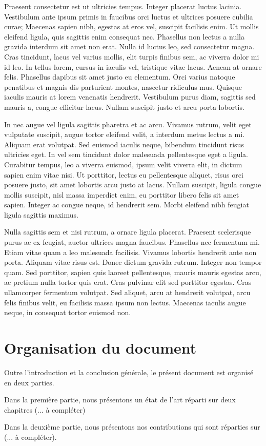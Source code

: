 Praesent consectetur est ut ultricies tempus. Integer placerat luctus lacinia. 
Vestibulum ante ipsum primis in faucibus orci luctus et ultrices posuere cubilia curae; Maecenas sapien nibh, egestas at eros vel, suscipit facilisis enim. 
Ut mollis eleifend ligula, quis sagittis enim consequat nec. Phasellus non lectus a nulla gravida interdum sit amet non erat. 
Nulla id luctus leo, sed consectetur magna. Cras tincidunt, lacus vel varius mollis, elit turpis finibus sem, ac viverra dolor mi id leo. 
In tellus lorem, cursus in iaculis vel, tristique vitae lacus. Aenean at ornare felis. Phasellus dapibus sit amet justo eu elementum. 
Orci varius natoque penatibus et magnis dis parturient montes, nascetur ridiculus mus. Quisque iaculis mauris at lorem venenatis hendrerit. 
Vestibulum purus diam, sagittis sed mauris a, congue efficitur lacus. Nullam suscipit justo et arcu porta lobortis.

In nec augue vel ligula sagittis pharetra et ac arcu. Vivamus rutrum, velit eget vulputate suscipit, augue tortor eleifend velit, a interdum metus lectus a mi. 
Aliquam erat volutpat. Sed euismod iaculis neque, bibendum tincidunt risus ultricies eget. 
In vel sem tincidunt dolor malesuada pellentesque eget a ligula. Curabitur tempus, leo a viverra euismod, ipsum velit viverra elit, in dictum sapien enim vitae nisi. Ut porttitor, lectus eu pellentesque aliquet, risus orci posuere justo, sit amet lobortis arcu justo at lacus. 
Nullam suscipit, ligula congue mollis suscipit, nisl massa imperdiet enim, eu porttitor libero felis sit amet sapien. 
Integer ac congue neque, id hendrerit sem. Morbi eleifend nibh feugiat ligula sagittis maximus.

Nulla sagittis sem et nisi rutrum, a ornare ligula placerat. Praesent scelerisque purus ac ex feugiat, auctor ultrices magna faucibus. 
Phasellus nec fermentum mi. Etiam vitae quam a leo malesuada facilisis. Vivamus lobortis hendrerit ante non porta. 
Aliquam vitae risus est. Donec dictum gravida rutrum. Integer non tempor quam. 
Sed porttitor, sapien quis laoreet pellentesque, mauris mauris egestas arcu, ac pretium nulla tortor quis erat. 
Cras pulvinar elit sed porttitor egestas. Cras ullamcorper fermentum volutpat. 
Sed aliquet, arcu at hendrerit volutpat, arcu felis finibus velit, eu facilisis massa ipsum non lectus. 
Maecenas iaculis augue neque, in consequat tortor euismod non. 

\section{Organisation du document}
Outre l'introduction et la conclusion générale, le présent document est organisé en deux parties.

Dans la première partie, nous présentons un état de l'art réparti sur deux chapitres (... à compléter)

Dans la deuxième partie, nous présentons nos contributions qui sont réparties sur (... à compléter).

